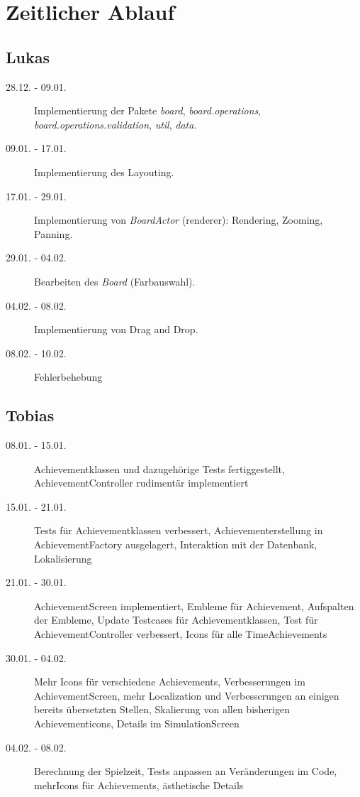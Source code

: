\chapter{Zeitlicher Ablauf}

\section{Lukas}
\begin{description}
\item[28.12. - 09.01.]
Implementierung der Pakete \emph{board}, \emph{board.operations}, \emph{board.operations.validation}, \emph{util}, \emph{data}.
\item[09.01. - 17.01.]
Implementierung des Layouting.
\item[17.01. - 29.01.]
Implementierung von \emph{BoardActor} (renderer): Rendering, Zooming, Panning.
\item[29.01. - 04.02.]
Bearbeiten des \emph{Board} (Farbauswahl).
\item[04.02. - 08.02.]
Implementierung von Drag and Drop.
\item[08.02. - 10.02.]
Fehlerbehebung
\end{description}

\section{Tobias}
\begin{description}
\item[08.01. - 15.01.]
Achievementklassen und dazugehörige Tests fertiggestellt, AchievementController rudimentär implementiert
\item[15.01. - 21.01.]
Tests für Achievementklassen verbessert, Achievementerstellung in AchievementFactory ausgelagert, Interaktion mit der Datenbank, Lokalisierung
\item[21.01. - 30.01.]
AchievementScreen implementiert, Embleme für Achievement, Aufspalten der Embleme, Update Testcases für Achievementklassen, Test für AchievementController verbessert, Icons für alle TimeAchievements
\item[30.01. - 04.02.]
Mehr Icons für verschiedene Achievements, Verbesserungen im AchievementScreen, mehr Localization und Verbesserungen an einigen bereits übersetzten Stellen, Skalierung von allen bisherigen Achievementicons, Details im SimulationScreen
\item[04.02. - 08.02.]
Berechnung der Spielzeit, Tests anpassen an Veränderungen im Code, mehrIcons für Achievements, ästhetische Details
\end{description}

